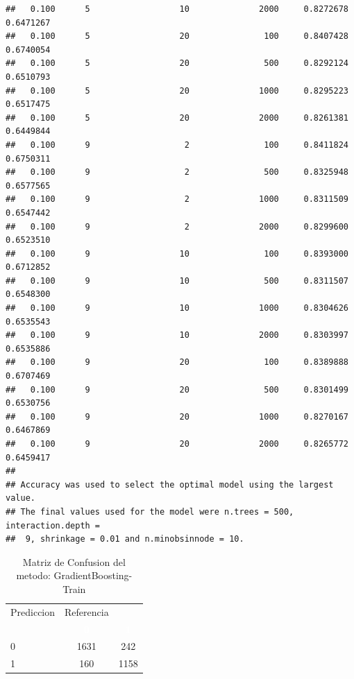 \documentclass[]{article}
\begin{document}
\begin{lstlisting}
##   0.100      5                  10              2000     0.8272678  0.6471267
##   0.100      5                  20               100     0.8407428  0.6740054
##   0.100      5                  20               500     0.8292124  0.6510793
##   0.100      5                  20              1000     0.8295223  0.6517475
##   0.100      5                  20              2000     0.8261381  0.6449844
##   0.100      9                   2               100     0.8411824  0.6750311
##   0.100      9                   2               500     0.8325948  0.6577565
##   0.100      9                   2              1000     0.8311509  0.6547442
##   0.100      9                   2              2000     0.8299600  0.6523510
##   0.100      9                  10               100     0.8393000  0.6712852
##   0.100      9                  10               500     0.8311507  0.6548300
##   0.100      9                  10              1000     0.8304626  0.6535543
##   0.100      9                  10              2000     0.8303997  0.6535886
##   0.100      9                  20               100     0.8389888  0.6707469
##   0.100      9                  20               500     0.8301499  0.6530756
##   0.100      9                  20              1000     0.8270167  0.6467869
##   0.100      9                  20              2000     0.8265772  0.6459417
## 
## Accuracy was used to select the optimal model using the largest value.
## The final values used for the model were n.trees = 500, interaction.depth =
##  9, shrinkage = 0.01 and n.minobsinnode = 10.
\end{lstlisting}

\begin{table}[!h]

\caption{\label{tab:MatrizConf_GradientBoosting-Train}Matriz de Confusion del metodo: GradientBoosting-Train }
\centering
\begin{tabular}[t]{lcc}
\toprule
\multicolumn{1}{c}{Prediccion} & \multicolumn{1}{c}{Referencia} & \multicolumn{1}{c}{ } \\
\cmidrule(l{3pt}r{3pt}){1-1} \cmidrule(l{3pt}r{3pt}){2-2}
\rowcolor{black}  \multicolumn{1}{c}{\textcolor{white}{\textbf{ }}} & \multicolumn{1}{c}{\textcolor{white}{\textbf{0}}} & \multicolumn{1}{c}{\textcolor{white}{\textbf{1}}}\\
\midrule
\rowcolor{gray!6}  0 & 1631 & 242\\
1 & 160 & 1158\\
\bottomrule
\end{tabular}
\end{table}
\end{document}
